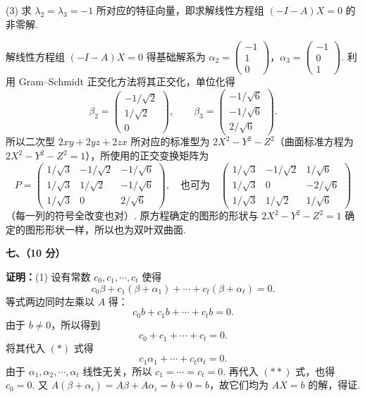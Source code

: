 \documentclass[a4paper,11pt]{ctexart}
\begin{document}
(3) 求 $\lambda_2 = \lambda_3 = -1$ 所对应的特征向量，即求解线性方程组 $(-I - A)X = 0$ 的非零解.

解线性方程组 $(-I - A)X = 0$ 得基础解系为 $\alpha_2 = \begin{pmatrix} -1 \\ 1 \\ 0 \end{pmatrix}$，$\alpha_3 = \begin{pmatrix} -1 \\ 0 \\ 1 \end{pmatrix}$. 利用 Gram--Schmidt 正交化方法将其正交化，单位化得
\[
  \beta_2 = \begin{pmatrix} -1/\sqrt{2} \\ 1/\sqrt{2} \\ 0 \end{pmatrix},\qquad
  \beta_3 = \begin{pmatrix} -1/\sqrt{6} \\ -1/\sqrt{6} \\ 2/\sqrt{6} \end{pmatrix}.
\]
所以二次型 $2xy + 2yz + 2zx$ 所对应的标准型为 $2X^2 - Y^2 - Z^2$（曲面标准方程为 $2X^2 - Y^2 - Z^2 = 1$），所使用的正交变换矩阵为
\[
  P = \begin{pmatrix}
    1/\sqrt{3} & -1/\sqrt{2} & -1/\sqrt{6} \\
    1/\sqrt{3} & 1/\sqrt{2} & -1/\sqrt{6} \\
    1/\sqrt{3} & 0 & 2/\sqrt{6}
  \end{pmatrix},
  \quad\text{也可为}\quad
  \begin{pmatrix}
    1/\sqrt{3} & -1/\sqrt{2} & 1/\sqrt{6} \\
    1/\sqrt{3} & 0 & -2/\sqrt{6} \\
    1/\sqrt{3} & 1/\sqrt{2} & 1/\sqrt{6}
  \end{pmatrix}
\]
（每一列的符号全改变也对）.
原方程确定的图形的形状与 $2X^2 - Y^2 - Z^2 = 1$ 确定的图形形状一样，所以也为双叶双曲面.

\vspace{0.8em}

\textbf{七、（10 分）}

\textbf{证明：}(1) 设有常数 $c_0, c_1, \cdots, c_t$ 使得
\begin{equation*}
  c_0 \beta + c_1 (\beta + \alpha_1) + \cdots + c_t (\beta + \alpha_t) = 0. \tag{$*$}
\end{equation*}
等式两边同时左乘以 $A$ 得：
\[
  c_0 b + c_1 b + \cdots + c_t b = 0.
\]
由于 $b \neq 0$，所以得到
\begin{equation*}
  c_0 + c_1 + \cdots + c_t = 0. \tag{$**$}
\end{equation*}
将其代入 $(*)$ 式得
\[
  c_1 \alpha_1 + \cdots + c_t \alpha_t = 0.
\]
由于 $\alpha_1, \alpha_2, \cdots, \alpha_t$ 线性无关，所以 $c_1 = \cdots = c_t = 0$. 再代入 $(**)$ 式，也得 $c_0 = 0$. 又 $A(\beta + \alpha_i) = A\beta + A\alpha_i = b + 0 = b$，故它们均为 $AX = b$ 的解，得证.
\end{document}
